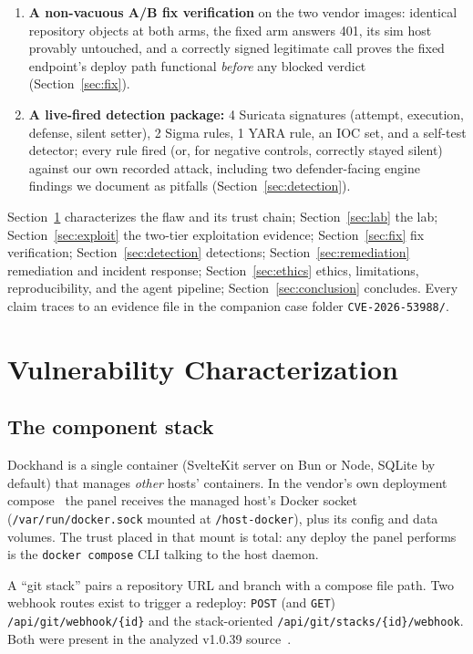 \documentclass[journal]{IEEEtran}
\begin{document}
\begin{enumerate}
\item \textbf{A non-vacuous A/B fix verification} on the two vendor images:
      identical repository objects at both arms, the fixed arm answers 401,
      its sim host provably untouched, and a correctly signed legitimate call
      proves the fixed endpoint's deploy path functional \emph{before} any
      blocked verdict (Section~\ref{sec:fix}).
\item \textbf{A live-fired detection package:} 4 Suricata signatures (attempt,
      execution, defense, silent setter), 2 Sigma rules, 1 YARA rule, an IOC
      set, and a self-test detector; every rule fired (or, for negative
      controls, correctly stayed silent) against our own recorded attack,
      including two defender-facing engine findings we document as pitfalls
      (Section~\ref{sec:detection}).
\end{enumerate}

Section~\ref{sec:vuln} characterizes the flaw and its trust chain;
Section~\ref{sec:lab} the lab; Section~\ref{sec:exploit} the two-tier
exploitation evidence; Section~\ref{sec:fix} fix verification;
Section~\ref{sec:detection} detections; Section~\ref{sec:remediation}
remediation and incident response; Section~\ref{sec:ethics} ethics,
limitations, reproducibility, and the agent pipeline;
Section~\ref{sec:conclusion} concludes. Every claim traces to an evidence file
in the companion case folder \texttt{CVE-2026-53988/}.

\section{Vulnerability Characterization}
\label{sec:vuln}

\subsection{The component stack}

Dockhand is a single container (SvelteKit server on Bun or Node, SQLite by
default) that manages \emph{other} hosts' containers. In the vendor's own
deployment compose~\cite{vendorrepo} the panel receives the managed host's
Docker socket (\texttt{/var/run/docker.sock} mounted at
\texttt{/host-docker}), plus its config and data volumes. The trust placed in
that mount is total: any deploy the panel performs is the \texttt{docker
compose} CLI talking to the host daemon.

A ``git stack'' pairs a repository URL and branch with a compose file path.
Two webhook routes exist to trigger a redeploy: \texttt{POST} (and
\texttt{GET}) \texttt{/api/git/}\allowbreak\texttt{webhook/\{id\}} and the
stack-oriented \texttt{/api/git/}\allowbreak\texttt{stacks/\{id\}/webhook}.
Both were present in the analyzed v1.0.39 source~\cite{vendorrepo}.
\end{document}
